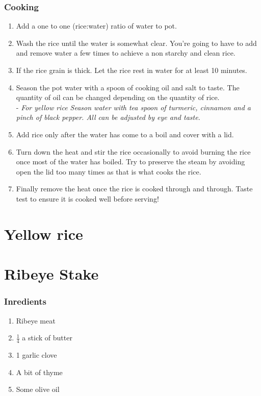 \subsubsection{Cooking}
\begin{enumerate}
    \item Add a one to one (rice:water) ratio of water to pot.
    \item Wash the rice until the water is somewhat clear. You're going to have to add and remove water a few times to achieve a non starchy and clean rice.
    \item If the rice grain is thick. Let the rice rest in water for at least 10 minutes.
    \item Season the pot water with a spoon of cooking oil and salt to taste. The quantity of oil can be changed depending on the quantity of rice.\\
        - \textit{For yellow rice Season water with tea spoon of turmeric, cinnamon and a pinch of black pepper. All can be adjusted by eye and taste.}
    \item Add rice only after the water has come to a boil and cover with a lid.
    \item Turn down the heat and stir the rice occasionally to avoid burning the rice once most of the water has boiled. Try to preserve the steam by avoiding open the lid too many times as that is what cooks the rice.
    \item Finally remove the heat once the rice is cooked through and through. Taste test to ensure it is cooked well before serving!
\end{enumerate}

\section{Yellow rice}

\section{Ribeye Stake}
\subsubsection{Inredients}
\begin{enumerate}
    \item Ribeye meat
    \item $\frac{1}{4}$ a stick of butter
    \item 1 garlic clove
    \item A bit of thyme
    \item Some olive oil
\end{enumerate}

